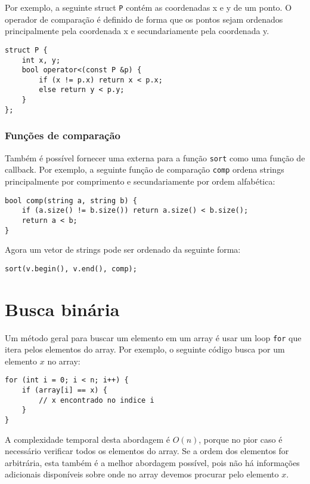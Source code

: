 Por exemplo, a seguinte struct \texttt{P}
contém as coordenadas x e y de um ponto.
O operador de comparação é definido de forma que os pontos sejam ordenados principalmente pela coordenada x e secundariamente pela coordenada y.

\begin{lstlisting}
struct P {
    int x, y;
    bool operator<(const P &p) {
        if (x != p.x) return x < p.x;
        else return y < p.y;
    }
};
\end{lstlisting}

\subsubsection{Funções de comparação}


Também é possível fornecer uma  externa para a função \texttt{sort} como uma função de callback. Por exemplo, a seguinte função de comparação \texttt{comp} ordena strings principalmente por comprimento e secundariamente por ordem alfabética:

\begin{lstlisting}
bool comp(string a, string b) {
    if (a.size() != b.size()) return a.size() < b.size();
    return a < b;
}
\end{lstlisting}
Agora um vetor de strings pode ser ordenado da seguinte forma:
\begin{lstlisting}
sort(v.begin(), v.end(), comp);
\end{lstlisting}

\section{Busca binária}


Um método geral para buscar um elemento em um array é usar um loop \texttt{for}
que itera pelos elementos do array.
Por exemplo, o seguinte código busca por um elemento $x$ no array:

\begin{lstlisting}
for (int i = 0; i < n; i++) {
    if (array[i] == x) {
        // x encontrado no indice i
    }
}
\end{lstlisting}

A complexidade temporal desta abordagem é $O(n)$,
porque no pior caso é necessário verificar todos os elementos do array.
Se a ordem dos elementos for arbitrária, esta também é a melhor abordagem possível, pois não há informações adicionais disponíveis sobre onde no array devemos procurar pelo elemento $x$.

